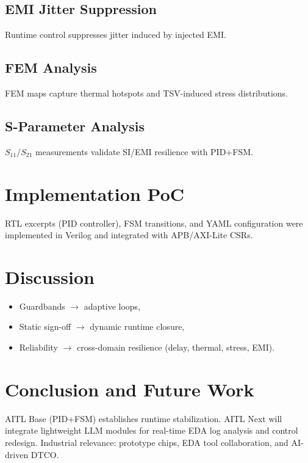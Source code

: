 \documentclass[conference]{IEEEtran}
\begin{document}
\subsection{EMI Jitter Suppression}
Runtime control suppresses jitter induced by injected EMI.

\subsection{FEM Analysis}
FEM maps capture thermal hotspots and TSV-induced stress distributions.

\subsection{S-Parameter Analysis}
$S_{11}/S_{21}$ measurements validate SI/EMI resilience with PID+FSM.

\section{Implementation PoC}
RTL excerpts (PID controller), FSM transitions, and YAML configuration were implemented in Verilog and integrated with APB/AXI-Lite CSRs.

\section{Discussion}
\begin{itemize}
  \item Guardbands $\rightarrow$ adaptive loops,
  \item Static sign-off $\rightarrow$ dynamic runtime closure,
  \item Reliability $\rightarrow$ cross-domain resilience (delay, thermal, stress, EMI).
\end{itemize}

\section{Conclusion and Future Work}
AITL Base (PID+FSM) establishes runtime stabilization.  
AITL Next will integrate lightweight LLM modules for real-time EDA log analysis and control redesign.  
Industrial relevance: prototype chips, EDA tool collaboration, and AI-driven DTCO.
\end{document}
